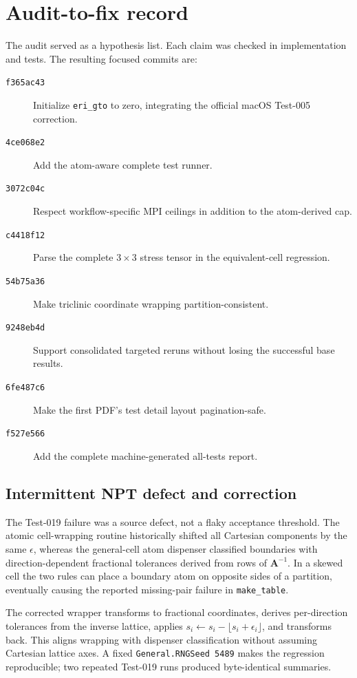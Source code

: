 \documentclass[aps,prb,preprint,superscriptaddress,longbibliography,floatfix]{revtex4-2}
\newcommand{\code}[1]{\texttt{#1}}
\begin{document}
\section{Audit-to-fix record}
The audit served as a hypothesis list. Each claim was checked in implementation and tests. The resulting focused commits are:
\begin{description}
\item[\code{f365ac43}] Initialize \code{eri\_gto} to zero, integrating the official macOS Test-005 correction.
\item[\code{4ce068e2}] Add the atom-aware complete test runner.
\item[\code{3072c04c}] Respect workflow-specific MPI ceilings in addition to the atom-derived cap.
\item[\code{c4418f12}] Parse the complete $3\times3$ stress tensor in the equivalent-cell regression.
\item[\code{54b75a36}] Make triclinic coordinate wrapping partition-consistent.
\item[\code{9248eb4d}] Support consolidated targeted reruns without losing the successful base results.
\item[\code{6fe487c6}] Make the first PDF's test detail layout pagination-safe.
\item[\code{f527e566}] Add the complete machine-generated all-tests report.
\end{description}

\subsection{Intermittent NPT defect and correction}
The Test-019 failure was a source defect, not a flaky acceptance threshold. The atomic cell-wrapping routine historically shifted all Cartesian components by the same $\epsilon$, whereas the general-cell atom dispenser classified boundaries with direction-dependent fractional tolerances derived from rows of $\mathbf A^{-1}$. In a skewed cell the two rules can place a boundary atom on opposite sides of a partition, eventually causing the reported missing-pair failure in \code{make\_table}.

The corrected wrapper transforms to fractional coordinates, derives per-direction tolerances from the inverse lattice, applies $s_i\leftarrow s_i-\lfloor s_i+\epsilon_i\rfloor$, and transforms back. This aligns wrapping with dispenser classification without assuming Cartesian lattice axes. A fixed \code{General.RNGSeed 5489} makes the regression reproducible; two repeated Test-019 runs produced byte-identical summaries.
\end{document}
